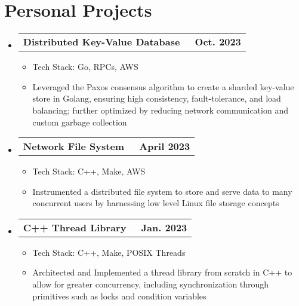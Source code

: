\documentclass[letterpaper,11pt]{article}
\makeatletter
\newcommand{\resumeItem}[1]{
  \item\small{
    {#1 \vspace{-3pt}}
  }
}
\newcommand{\resumeProjectHeading}[2]{
  \vspace{-3pt}\item
    \begin{tabular*}{1.0\textwidth}[t]{l@{\extracolsep{\fill}}r}
      \textbf{#1} & \textbf{\small #2} \\
    \end{tabular*}\vspace{-7pt}
}
\newcommand{\resumeSubHeadingListStart}{\begin{itemize}[leftmargin=0.0in, label={}]}
\newcommand{\resumeSubHeadingListEnd}{\end{itemize}}
\newcommand{\resumeItemListStart}{\begin{itemize}}
\newcommand{\resumeItemListEnd}{\end{itemize}\vspace{0pt}}
\makeatother
\begin{document}
\section{Personal Projects}
\resumeSubHeadingListStart

\resumeProjectHeading
{Distributed Key-Value Database{\raisebox{-0.2\height}\ }}
{Oct. 2023}
\resumeItemListStart
\resumeItem{Tech Stack: Go, RPCs, AWS}
\resumeItem{Leveraged the Paxos consensus algorithm to create a sharded key-value store in Golang, ensuring high consistency, fault-tolerance, and load balancing; further optimized by reducing network communication and custom garbage collection}
\resumeItemListEnd

\resumeProjectHeading
{Network File System{\raisebox{-0.2\height}\ }}
{April 2023}
\resumeItemListStart
\resumeItem{Tech Stack: C++, Make, AWS}
\resumeItem{Instrumented a distributed file system to store and serve data to many concurrent users by harnessing low level Linux file storage concepts}
\resumeItemListEnd

\resumeProjectHeading
{C++ Thread Library{\raisebox{-0.2\height}\ }}
{Jan. 2023}
\resumeItemListStart
\resumeItem{Tech Stack: C++, Make, POSIX Threads}
\resumeItem{Architected and Implemented a thread library from scratch in C++ to allow for greater concurrency, including synchronization through primitives such as locks and condition variables}
\resumeItemListEnd

\resumeSubHeadingListEnd
\end{document}
